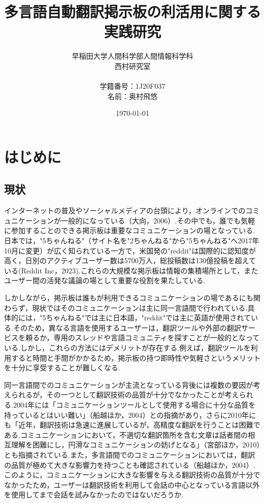 \documentclass[b5paper,12pt,dvipdfmx]{jsreport}
\title{多言語自動翻訳掲示板の利活用に関する実践研究}
\author{早稲田大学人間科学部人間情報科学科\\西村研究室\\ \\学籍番号：1J20F037\\名前：奥村飛悠}
\date{\today}
\begin{document}
\maketitle

\tableofcontents

\clearpage %
\chapter{はじめに}
 
\section{現状}

インターネットの普及やソーシャルメディアの台頭により，オンラインでのコミュニケーションが一般的になっている（大向，2006）.その中でも，誰でも気軽に参加することのできる掲示板は重要なコミュニケーションの場となっている.日本では，"5ちゃんねる"（サイト名を"2ちゃんねる"から"5ちゃんねる"へ2017年10月に変更）が広く知られている一方で，米国発の"reddit"は国際的に認知度が高く，日別のアクティブユーザー数は5700万人，総投稿数は130億投稿を超えている(Reddit Inc，2023).これらの大規模な掲示板は情報の集積場所として，またユーザー間の活発な議論の場として重要な役割を果たしている.

しかしながら，掲示板は誰もが利用できるコミュニケーションの場であるにも関わらず，現状ではそのコミュニケーションは主に同一言語間で行われている.具体的には，"5ちゃんねる"では主に日本語，"reddit"では主に英語が使用されている.そのため，異なる言語を使用するユーザーは，翻訳ツールや外部の翻訳サービスを頼るか，専用のスレッドや言語コミュニティを探すことが一般的となっている.しかし，これらの方法にはデメリットが存在する.例えば，翻訳ツールを利用すると時間と手間がかかるため，掲示板の持つ即時性や気軽さというメリットを十分に享受することが難しくなる.

同一言語間でのコミュニケーションが主流となっている背後には複数の要因が考えられるが，その一つとして翻訳技術の品質が十分でなかったことが考えられる.2004年には「コミュニケーションツールとして使用する場合に十分な品質を持っているとはいい難い」（船越ほか，2004）との指摘があり，さらに2010年にも「近年，翻訳技術は急速に進展しているが，高精度な翻訳を行うことは困難である.コミュニケーションにおいて，不適切な翻訳箇所を含む文章は話者間の相互理解を困難にし，円滑なコミュニケーションの妨げとなる」（宮部ほか，2010）とも指摘されている.また，多言語間でのコミュニケーションにおいては，翻訳の品質が極めて大きな影響力を持つことも確認されている（船越ほか，2004）.このように，コミュニケーションに大きな影響を与える翻訳技術の品質が十分でなかったため，ユーザーは翻訳技術を利用して会話の中心となっている言語以外を使用してまで会話を試みなかったのではないだろうか.
\end{document}
